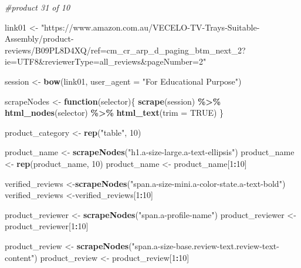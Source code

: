 \documentclass[
]{article}
\newenvironment{Shaded}{\begin{snugshade}}{\end{snugshade}}
\newcommand{\AttributeTok}[1]{\textcolor[rgb]{0.13,0.29,0.53}{#1}}
\newcommand{\CommentTok}[1]{\textcolor[rgb]{0.56,0.35,0.01}{\textit{#1}}}
\newcommand{\ConstantTok}[1]{\textcolor[rgb]{0.56,0.35,0.01}{#1}}
\newcommand{\ControlFlowTok}[1]{\textcolor[rgb]{0.13,0.29,0.53}{\textbf{#1}}}
\newcommand{\DecValTok}[1]{\textcolor[rgb]{0.00,0.00,0.81}{#1}}
\newcommand{\FunctionTok}[1]{\textcolor[rgb]{0.13,0.29,0.53}{\textbf{#1}}}
\newcommand{\NormalTok}[1]{#1}
\newcommand{\OtherTok}[1]{\textcolor[rgb]{0.56,0.35,0.01}{#1}}
\newcommand{\SpecialCharTok}[1]{\textcolor[rgb]{0.81,0.36,0.00}{\textbf{#1}}}
\newcommand{\StringTok}[1]{\textcolor[rgb]{0.31,0.60,0.02}{#1}}
\begin{document}
\begin{Shaded}
\begin{Highlighting}[]
\CommentTok{\#product 31 of 10}

\NormalTok{link01 }\OtherTok{\textless{}{-}} \StringTok{"https://www.amazon.com.au/VECELO{-}TV{-}Trays{-}Suitable{-}Assembly/product{-}reviews/B09PL8D4XQ/ref=cm\_cr\_arp\_d\_paging\_btm\_next\_2?ie=UTF8\&reviewerType=all\_reviews\&pageNumber=2"}


\NormalTok{  session }\OtherTok{\textless{}{-}} \FunctionTok{bow}\NormalTok{(link01,}
               \AttributeTok{user\_agent =} \StringTok{"For Educational Purpose"}\NormalTok{)}

\NormalTok{  scrapeNodes }\OtherTok{\textless{}{-}} \ControlFlowTok{function}\NormalTok{(selector)\{}
    \FunctionTok{scrape}\NormalTok{(session) }\SpecialCharTok{\%\textgreater{}\%}
      \FunctionTok{html\_nodes}\NormalTok{(selector) }\SpecialCharTok{\%\textgreater{}\%}
      \FunctionTok{html\_text}\NormalTok{(}\AttributeTok{trim =} \ConstantTok{TRUE}\NormalTok{)}
\NormalTok{  \}}

\NormalTok{  product\_category }\OtherTok{\textless{}{-}} \FunctionTok{rep}\NormalTok{(}\StringTok{"table"}\NormalTok{, }\DecValTok{10}\NormalTok{)}

\NormalTok{  product\_name }\OtherTok{\textless{}{-}} \FunctionTok{scrapeNodes}\NormalTok{(}\StringTok{"h1.a{-}size{-}large.a{-}text{-}ellipsis"}\NormalTok{)}
\NormalTok{  product\_name }\OtherTok{\textless{}{-}} \FunctionTok{rep}\NormalTok{(product\_name, }\DecValTok{10}\NormalTok{)}
\NormalTok{  product\_name }\OtherTok{\textless{}{-}}\NormalTok{ product\_name[}\DecValTok{1}\SpecialCharTok{:}\DecValTok{10}\NormalTok{]}
  
\NormalTok{  verified\_reviews }\OtherTok{\textless{}{-}}\FunctionTok{scrapeNodes}\NormalTok{(}\StringTok{"span.a{-}size{-}mini.a{-}color{-}state.a{-}text{-}bold"}\NormalTok{)}
\NormalTok{  verified\_reviews }\OtherTok{\textless{}{-}}\NormalTok{verified\_reviews[}\DecValTok{1}\SpecialCharTok{:}\DecValTok{10}\NormalTok{]}
  
\NormalTok{  product\_reviewer }\OtherTok{\textless{}{-}} \FunctionTok{scrapeNodes}\NormalTok{(}\StringTok{"span.a{-}profile{-}name"}\NormalTok{)}
\NormalTok{  product\_reviewer }\OtherTok{\textless{}{-}}\NormalTok{ product\_reviewer[}\DecValTok{1}\SpecialCharTok{:}\DecValTok{10}\NormalTok{]}
  
\NormalTok{  product\_review }\OtherTok{\textless{}{-}} \FunctionTok{scrapeNodes}\NormalTok{(}\StringTok{"span.a{-}size{-}base.review{-}text.review{-}text{-}content"}\NormalTok{)}
\NormalTok{  product\_review }\OtherTok{\textless{}{-}}\NormalTok{ product\_review[}\DecValTok{1}\SpecialCharTok{:}\DecValTok{10}\NormalTok{]}
  

\end{Highlighting}
\end{Shaded}
\end{document}

